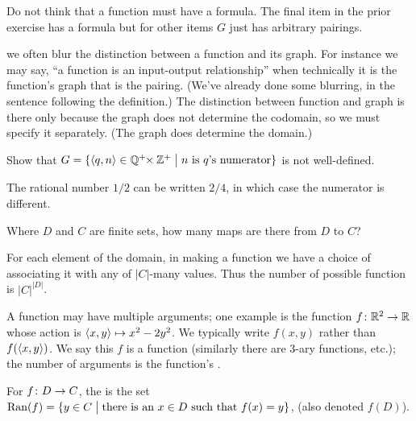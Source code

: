 \documentclass{ibl}  %
\begin{document}
Do not think that a function must have a formula.
The final item in the prior exercise has a formula but for other items 
$G$ just has arbitrary pairings.

\remark we often blur the distinction between a function and its graph.
For instance we may say, ``a function is an input-output relationship'' 
when technically it is the function's graph that is the pairing.
(We've already done some blurring, in the sentence following the definition.)
The distinction between function and graph
is there only because the graph does not determine the codomain,
so we must specify it separately.
(The graph does determine the domain.)

\begin{problem}[\maxlength]
Show that
$G=\{\langle q,n\rangle\in \mathbb{Q}^+\!\!\times\mathbb{Z}^+ \bigm| \text{$n$ is $q$'s numerator}\}$
is not well-defined.
\begin{answer}
The rational number $1/2$ can be written $2/4$, in which case the numerator 
is different.  
\end{answer}
\end{problem}

\begin{problem}[\maxlength]
Where $D$ and $C$ are finite sets,
how many maps are there from $D$ to $C$?
\begin{answer}
For each element of the domain, in making a function we have a choice 
of associating it with any of $|C|$-many values.
Thus the number of possible function is $|C|^{|D|}$.
\end{answer}
\end{problem}

A function may have multiple arguments; one example is the function
$\mbox{$f\colon \mathbb{R}^2\to \mathbb{R}$}$ whose action is 
$\langle x,y\rangle\mapsto x^2-2y^2$.
We typically write 
$f(x,y)$ rather than
$f(\langle x,y\rangle)$.
We say this $f$ is a  function (similarly there
are $3$-ary functions, etc.);
the number of arguments is the function's .

\begin{df}
For $\mbox{$f\colon D\to C$}$, the  is the set
$\operatorname{Ran}(f)=\{y\in C \bigm| \text{there is an $x\in D$ such that $f(x)=y$}\}$,
(also denoted $f(D)$).
\end{df}
\end{document}
